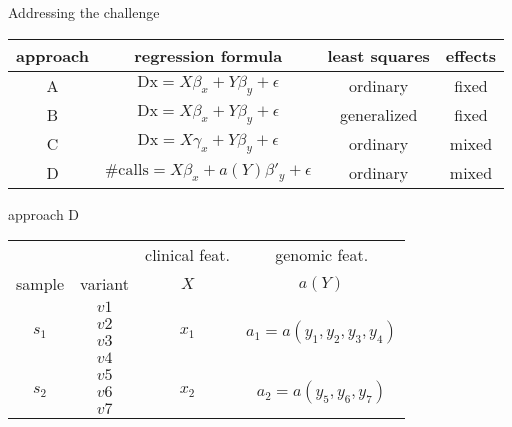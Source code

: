 \documentclass{beamer}
\begin{document}
\begin{frame}{Addressing the challenge}
\footnotesize
\begin{tabular}{cccc}
approach & regression formula & least squares & effects \\
\hline
A & \(\mathrm{Dx} = X\beta_x + Y\beta_y + \epsilon\) & ordinary & fixed \\
B &\(\mathrm{Dx} = X\beta_x + Y\beta_y + \epsilon\) & generalized & fixed \\
C & \(\mathrm{Dx} = X\gamma_x + Y\beta_y + \epsilon\) & ordinary & mixed\\
D & \(\mathrm{\#calls} = X\beta_x + a(Y)\beta'_y + \epsilon\) & ordinary & mixed\\
\end{tabular}
\vfill
\begin{flushright}
approach D
\begin{tabular}{cc|c|c}
& & clinical feat. & genomic feat. \\
sample & variant & \(X\) & \(a(Y)\) \\
\hline
\multirow{4}{*}{\(s_1\)} & \(v1\) & \multirow{4}{*}{\(x_1\)} &
\multirow{4}{*}{\(a_1 = a(y_1, y_2, y_3, y_4)\)} \\
& \(v2\) & & \\
& \(v3\) & & \\
& \(v4\) & & \\
\hline
\multirow{3}{*}{\(s_2\)} & \(v5\) & \multirow{3}{*}{\(x_2\)} &
\multirow{3}{*}{\(a_2 = a(y_5, y_6, y_7)\)} \\
& \(v6\) & & \\
& \(v7\) & & \\
\end{tabular}
\end{flushright}
\end{frame}
\end{document}
